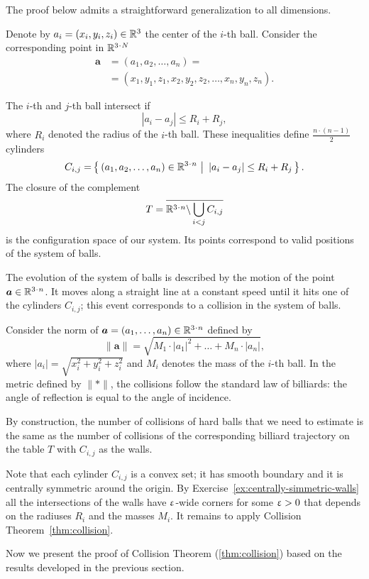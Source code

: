 The proof below admits a straightforward generalization to all dimensions.

Denote by $a_i=(x_i,y_i,z_i) \in \RR^3$ the center of the $i$-th ball.
Consider the corresponding point in $\RR^{3\cdot N}$
\begin{align*}
\bm{a}&=(a_1, a_2 , \dots , a_n ) =
\\
&=(x_1, y_1 , z_1 , x_2 , y_2 , z_2 , \dots , x_n , y_n , z_n).
\end{align*}

The $i$-th and $j$-th ball intersect if 
$$|a_i - a_j | \le R_i+R_j,$$
where $R_i$ denoted the radius of the $i$-th ball.
These inequalities define $\tfrac{n\cdot(n-1)}{2}$ cylinders 
\[C_{i,j}=\set{(a_1, a_2 , \dots , a_n )\in\RR^{3\cdot n}} {|a_i - a_j |\le R_i+R_j}.\] 
The closure of the complement
\[T=\overline{\RR^{3\cdot n}\backslash \bigcup_{i< j} C_{i,j}}\] 
is the configuration space of our system. 
Its points correspond
to valid positions of the system of balls.

The evolution of the system
of balls is described by the motion of
the point $\bm{a}\in\RR^{3\cdot n}$.
It moves along a straight line at a
constant speed until it hits one of the cylinders $C_{i,j}$; 
this event corresponds
to a collision in the system of balls.

Consider the norm of $\bm{a}=(a_1,\dots,a_n)\in \RR^{3\cdot n}$ defined by
\[\lVert \bm{a}\rVert
=
\sqrt{M_1\cdot|a_1|^2+\dots+M_n\cdot |a_n|},\]
where $|a_i|=\sqrt{x_i^2+y_i^2+z_i^2}$ 
and $M_i$ denotes the mass of the $i$-th ball.
In the metric defined by $\lVert {*}\rVert$,
the collisions follow the
standard law of billiards: 
the angle of reflection is equal to the angle
of incidence. 

By construction, the number of collisions of hard balls that we need to estimate 
is the same as the number of collisions of the corresponding billiard trajectory on the table $T$ with $C_{i,j}$ as the walls.

Note that each cylinder $C_{i,j}$ is a convex set;
it has smooth boundary 
and it is centrally symmetric around the origin.
By Exercise~\ref{ex:centrally-simmetric-walls} all the intersections of the walls have $\upvarepsilon$-wide corners for some $\upvarepsilon>0$ that depends on the radiuses $R_i$ and the masses $M_i$.
It remains to apply Collision Theorem~\ref{thm:collision}.
\qeds

Now we present the proof of Collision Theorem (\ref{thm:collision})
based on the results developed in the previous section.

